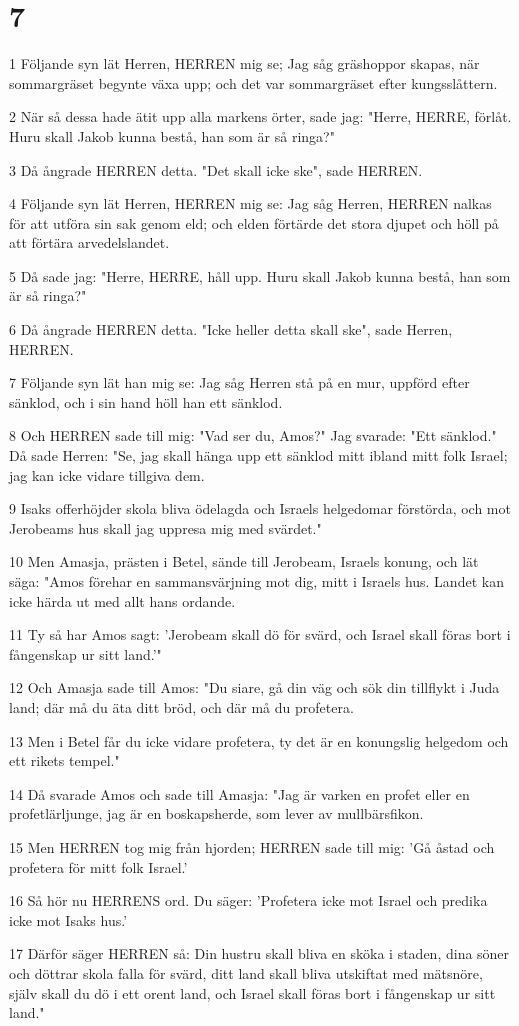 \chapter{7}

\par 1 Följande syn lät Herren, HERREN mig se; Jag såg gräshoppor skapas, när sommargräset begynte växa upp; och det var sommargräset efter kungsslåttern.
\par 2 När så dessa hade ätit upp alla markens örter, sade jag: "Herre, HERRE, förlåt. Huru skall Jakob kunna bestå, han som är så ringa?"
\par 3 Då ångrade HERREN detta. "Det skall icke ske", sade HERREN.
\par 4 Följande syn lät Herren, HERREN mig se: Jag såg Herren, HERREN nalkas för att utföra sin sak genom eld; och elden förtärde det stora djupet och höll på att förtära arvedelslandet.
\par 5 Då sade jag: "Herre, HERRE, håll upp. Huru skall Jakob kunna bestå, han som är så ringa?"
\par 6 Då ångrade HERREN detta. "Icke heller detta skall ske", sade Herren, HERREN.
\par 7 Följande syn lät han mig se: Jag såg Herren stå på en mur, uppförd efter sänklod, och i sin hand höll han ett sänklod.
\par 8 Och HERREN sade till mig: "Vad ser du, Amos?" Jag svarade: "Ett sänklod." Då sade Herren: "Se, jag skall hänga upp ett sänklod mitt ibland mitt folk Israel; jag kan icke vidare tillgiva dem.
\par 9 Isaks offerhöjder skola bliva ödelagda och Israels helgedomar förstörda, och mot Jerobeams hus skall jag uppresa mig med svärdet."
\par 10 Men Amasja, prästen i Betel, sände till Jerobeam, Israels konung, och lät säga: "Amos förehar en sammansvärjning mot dig, mitt i Israels hus. Landet kan icke härda ut med allt hans ordande.
\par 11 Ty så har Amos sagt: 'Jerobeam skall dö för svärd, och Israel skall föras bort i fångenskap ur sitt land.'"
\par 12 Och Amasja sade till Amos: "Du siare, gå din väg och sök din tillflykt i Juda land; där må du äta ditt bröd, och där må du profetera.
\par 13 Men i Betel får du icke vidare profetera, ty det är en konungslig helgedom och ett rikets tempel."
\par 14 Då svarade Amos och sade till Amasja: "Jag är varken en profet eller en profetlärljunge, jag är en boskapsherde, som lever av mullbärsfikon.
\par 15 Men HERREN tog mig från hjorden; HERREN sade till mig: 'Gå åstad och profetera för mitt folk Israel.'
\par 16 Så hör nu HERRENS ord. Du säger: 'Profetera icke mot Israel och predika icke mot Isaks hus.'
\par 17 Därför säger HERREN så: Din hustru skall bliva en sköka i staden, dina söner och döttrar skola falla för svärd, ditt land skall bliva utskiftat med mätsnöre, själv skall du dö i ett orent land, och Israel skall föras bort i fångenskap ur sitt land."

